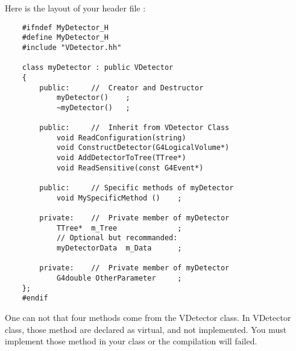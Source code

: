 \documentclass[a4paper,12pt]{article}
\begin{document}
Here is the layout of your header file :

\lstset{language=[GNU]C++,tabsize=4}
\begin{lstlisting}
	#ifndef MyDetector_H
	#define MyDetector_H
	#include "VDetector.hh"
	
	class myDetector : public VDetector
	{
		public:		//	Creator and Destructor
			myDetector()	;
			~myDetector()	;
			
		public:		//	Inherit from VDetector Class
			void ReadConfiguration(string)
			void ConstructDetector(G4LogicalVolume*)
			void AddDetectorToTree(TTree*)
			void ReadSensitive(const G4Event*)
			
		public:		// Specific methods of myDetector
			void MySpecificMethod ()	;
		
		private:	//	Private member of myDetector
			TTree*	m_Tree				;
			// Optional but recommanded:
			myDetectorData	m_Data		;
			
		private:	//	Private member of myDetector
			G4double OtherParameter		;			
	};
	#endif
\end{lstlisting}


One can not that four methods come from the VDetector class. In VDetector class, those method are declared as virtual, and not implemented. You must implement those method in your class or the compilation will failed.


\end{document}
